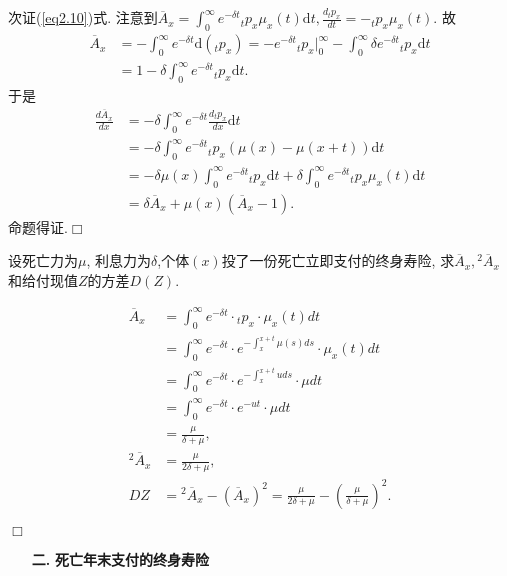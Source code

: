 \documentclass[a4paper,openany, 10pt]{ctexbook}
\newcommand{\hei}{\CJKfamily{hei}}      %
\def\qed{\hfill$\Box$\medskip}
\def\z{\left}
\def\y{\right}
\def\no{\nonumber}
\begin{document}
次证(\ref{eq2.10})式. 注意到$\overline{A}_x=\int_0^\infty e^{-\delta t}{}_tp_x\mu_x(t)\mathrm{d}t, \frac{d{}_tp_x}{dt} = -{}_tp_x\mu_x(t).$ 故
\begin{align}
  \overline{A}_x&=-\int_0^\infty e^{-\delta t}\mathrm{d}({}_tp_x) = -e^{-\delta t}{}_tp_x|_0^\infty -\int_0^\infty \delta e^{-\delta t}{}_tp_x\mathrm{d}t \no\\
  &= 1 - \delta \int_0^\infty e^{-\delta t}{}_tp_x\mathrm{d}t.\no
\end{align}
    于是
\begin{align*}
    \frac{d\overline{A}_x}{dx} & = -\delta \int_0^\infty e^{-\delta t}\frac{d{}_tp_x}{dx}\mathrm{d}t                                                            \\
                               & = -\delta \int_0^\infty e^{-\delta t}{}_tp_x(\mu(x) - \mu(x+t))\mathrm{d}t                                                     \\
                               & = -\delta \mu(x) \int_0^\infty e^{-\delta t}{}_tp_x\mathrm{d}t + \delta \int_0^\infty e^{-\delta t}{}_tp_x \mu_x(t)\mathrm{d}t \\
                               & = \delta \overline{A}_x + \mu(x)(\overline{A}_x - 1).
\end{align*}
命题得证.\qed
\begin{example}
    设死亡力为$\mu$, 利息力为$\delta$,个体$(x)$投了一份死亡立即支付的终身寿险, 求$\overline{A}_{x}, {}^2\overline{A}_{x} $和给付现值$Z$的方差$D(Z)$.

    \solution
    \begin{align*}
        \overline{A}_{x}     & =\int_0^{\infty}e^{-\delta t}\cdot {}_tp_x\cdot \mu_x(t)dt                                \\
                             & =\int_0^{\infty}e^{-\delta t}\cdot e^{-\int_x^{x+t}\mu(s)ds}\cdot \mu_x(t)dt                \\
                             & =\int_0^{\infty}e^{-\delta t}\cdot e^{-\int_x^{x+t}uds}\cdot \mu dt                        \\
                             & =\int_0^{\infty}e^{-\delta t}\cdot e^{-ut}\cdot \mu dt                                     \\
                             & =\frac{\mu}{\delta +\mu},                                                                    \\
        {}^2\overline{A}_{x} & =\frac{\mu}{2\delta +\mu},                                                                   \\
        DZ                   & ={}^2\overline{A}_{x}-(\overline{A}_{x})^2=\frac{\mu}{2\delta +\mu}-\z(\frac{\mu}{\delta +\mu}\y)^2.
    \end{align*}
\end{example}
\qed
\begin{itemize}
    \item[{\bf\hei 二.}]{\bf\hei 死亡年末支付的终身寿险}
\end{itemize}
\end{document}
